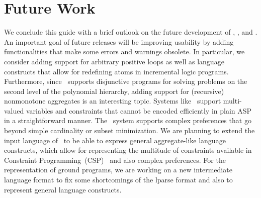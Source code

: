 \section{Future Work}\label{sec:future}

We conclude this guide with a brief outlook on the future development
of \gringo, \clasp, and \clingo.
An important goal of future releases will be improving usability
by adding functionalities that make some errors and warnings obsolete.
In particular, we consider adding support for arbitrary positive loops
as well as language constructs that allow for redefining atoms in incremental logic programs.
Furthermore, since \clasp\ supports disjunctive programs for solving problems on the second level of the polynomial hierarchy, 
adding support for (recursive) nonmonotone aggregates is an interesting topic.
Systems like \clingcon\ support multi-valued variables and constraints that cannot be encoded efficiently in plain ASP in a straightforward manner.
The \aspils\ system supports complex preferences that go beyond simple cardinality or subset minimization.
We are planning to extend the input language of \gringo\ to be able to express general aggregate-like language constructs,
which allow for representing the multitude of constraints available in Constraint Programming~(CSP)~\cite{CPHandbook} 
and also complex preferences.
For the representation of ground programs,
we are working on a new intermediate language format to fix some shortcomings of the lparse format
and also to represent general language constructs.

